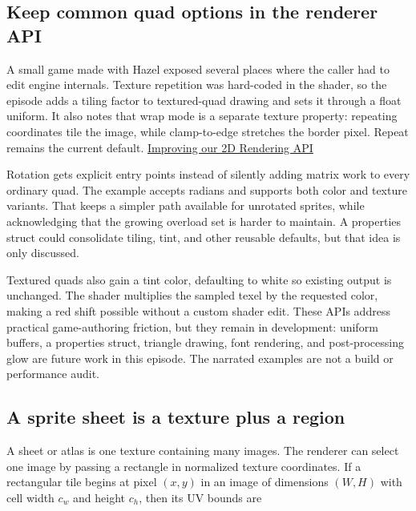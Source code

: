 \subsection{Keep common quad options in the renderer API}\label{06-engine-ii-ch026-keep-common-quad-options-in-the-renderer-api}

\hypertarget{06-engine-ii-ch026-keep-common-quad-options-in-the-renderer-api}{}

A small game made with Hazel exposed several places where the caller had to edit engine internals. Texture repetition was hard-coded in the shader, so the episode adds a tiling factor to textured-quad drawing and sets it through a float uniform. It also notes that wrap mode is a separate texture property: repeating coordinates tile the image, while clamp-to-edge stretches the border pixel. Repeat remains the current default. \href{https://www.youtube.com/watch?v=Q86V5DnSPPs}{Improving our 2D Rendering API}

Rotation gets explicit  entry points instead of silently adding matrix work to every ordinary quad. The example accepts radians and supports both color and texture variants. That keeps a simpler path available for unrotated sprites, while acknowledging that the growing overload set is harder to maintain. A properties struct could consolidate tiling, tint, and other reusable defaults, but that idea is only discussed.

Textured quads also gain a tint color, defaulting to white so existing output is unchanged. The shader multiplies the sampled texel by the requested color, making a red shift possible without a custom shader edit. These APIs address practical game-authoring friction, but they remain in development: uniform buffers, a properties struct, triangle drawing, font rendering, and post-processing glow are future work in this episode. The narrated examples are not a build or performance audit.

\subsection{A sprite sheet is a texture plus a region}\label{06-engine-ii-ch026-a-sprite-sheet-is-a-texture-plus-a-region}

\hypertarget{06-engine-ii-ch026-a-sprite-sheet-is-a-texture-plus-a-region}{}

A sheet or atlas is one texture containing many images. The renderer can select one image by passing a rectangle in normalized texture coordinates. If a rectangular tile begins at pixel \((x,y)\) in an image of dimensions \((W,H)\) with cell width \(c_w\) and height \(c_h\), then its UV bounds are


